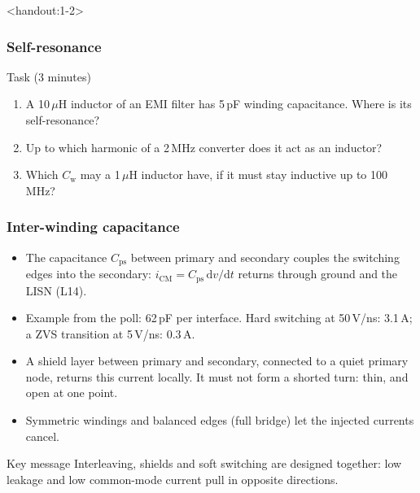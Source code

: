\begin{frame}<handout:1-2>
	\frametitle{Self-resonance}
	\begin{block}{Task (3 minutes)}
		\begin{enumerate}
			\item A 10\,$\mu$H inductor of an EMI filter has 5\,pF winding capacitance. Where is its self-resonance?
			\item Up to which harmonic of a 2\,MHz converter does it act as an inductor?
			\item Which $C_\mathrm{w}$ may a 1\,$\mu$H inductor have, if it must stay inductive up to 100\,MHz?
		\end{enumerate}
	\end{block}
\end{frame}

\begin{frame}
	\frametitle{Inter-winding capacitance}
	\begin{itemize}
		\item The capacitance $C_\mathrm{ps}$ between primary and secondary couples the switching edges into the secondary: $i_\mathrm{CM}=C_\mathrm{ps}\,\mathrm{d}v/\mathrm{d}t$ returns through ground and the LISN (L14).
		\item Example from the poll: 62\,pF per interface. Hard switching at 50\,V/ns: 3.1\,A; a ZVS transition at 5\,V/ns: 0.3\,A.
		\item A shield layer between primary and secondary, connected to a quiet primary node, returns this current locally. It must not form a shorted turn: thin, and open at one point.
		\item Symmetric windings and balanced edges (full bridge) let the injected currents cancel.
	\end{itemize}
	\begin{block}{Key message}
		Interleaving, shields and soft switching are designed together: low leakage and low common-mode current pull in opposite directions.
	\end{block}
\end{frame}

